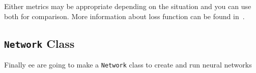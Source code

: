 
Either metrics may be appropriate depending on the situation and you can use both for comparison. More information about loss function can be found in~\cite{bib:loss_function}.

\subsection{\texttt{Network} Class}

Finally ee are going to make a \texttt{Network} class to create and run neural networks


%
%
%
%
